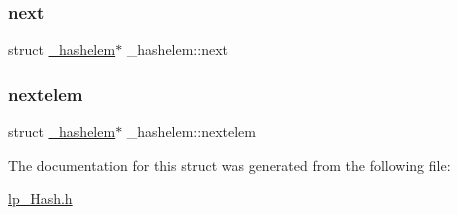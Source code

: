 \mbox{\label{struct__hashelem_a925499a1ad0bba3d46261e225db91f54}} 
\subsubsection{\texorpdfstring{next}{next}}
{\footnotesize\ttfamily struct \hyperlink{struct__hashelem}{\+\_\+hashelem}$\ast$ \+\_\+hashelem\+::next}

\mbox{\label{struct__hashelem_aa595ef35a10ccc03e3f63259b0018903}} 
\subsubsection{\texorpdfstring{nextelem}{nextelem}}
{\footnotesize\ttfamily struct \hyperlink{struct__hashelem}{\+\_\+hashelem}$\ast$ \+\_\+hashelem\+::nextelem}



The documentation for this struct was generated from the following file\+:\begin{DoxyCompactItemize}
\item 
\hyperlink{lp___hash_8h}{lp\+\_\+\+Hash.\+h}\end{DoxyCompactItemize}
